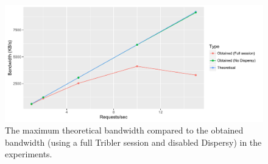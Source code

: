 \begin{figure}[h!]
	\centering
	\includegraphics[width=1.0\columnwidth]{images/experiments/api_bandwidth_performance}
	\caption{The maximum theoretical bandwidth compared to the obtained bandwidth (using a full Tribler session and disabled Dispersy) in the experiments.}
	\label{fig:api-bandwidth-performance}
\end{figure}

